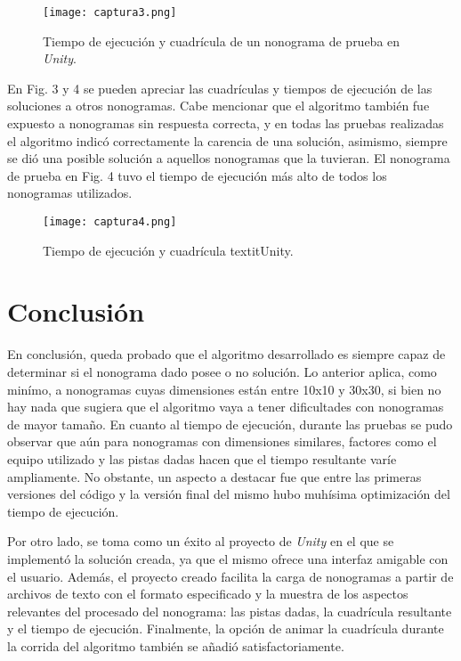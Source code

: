 \documentclass[conference]{IEEEtran}
\begin{document}
\begin{figure}[htbp]
\centerline{\texttt{[image: captura3.png]}}
\caption{Tiempo de ejecución y cuadrícula de un nonograma de prueba en \textit{Unity}.}
\label{Aleatorio20x30}
\end{figure}

En Fig. 3 y 4 se pueden apreciar las cuadrículas y tiempos de ejecución de las soluciones a otros nonogramas. Cabe mencionar que el algoritmo también fue expuesto a nonogramas sin respuesta correcta, y en todas las pruebas realizadas el algoritmo indicó correctamente la carencia de una solución, asimismo, siempre se dió una posible solución a aquellos nonogramas que la tuvieran. El nonograma de prueba en Fig. 4 tuvo el tiempo de ejecución más alto de todos los nonogramas utilizados.

\begin{figure}[htbp]
\centerline{\texttt{[image: captura4.png]}}
\caption{Tiempo de ejecución y cuadrícula textit{Unity}.}
\label{Aleatorio20x20}
\end{figure}

\section{Conclusión}
En conclusión, queda probado que el algoritmo desarrollado es siempre capaz de determinar si el nonograma dado posee o no solución. Lo anterior aplica, como minímo, a nonogramas cuyas dimensiones están entre 10x10 y 30x30, si bien no hay nada que sugiera que el algoritmo vaya a tener dificultades con nonogramas de mayor tamaño. En cuanto al tiempo de ejecución, durante las pruebas se pudo observar que aún para nonogramas con dimensiones similares, factores como el equipo utilizado y las pistas dadas hacen que el tiempo resultante varíe ampliamente. No obstante, un aspecto a destacar fue que entre las primeras versiones del código y la versión final del mismo hubo muhísima optimización del tiempo de ejecución.

Por otro lado, se toma como un éxito al proyecto de \textit{Unity} en el que se implementó la solución creada, ya que el mismo ofrece una interfaz amigable con el usuario. Además, el proyecto creado facilita la carga de nonogramas a partir de archivos de texto con el formato especificado y la muestra de los aspectos relevantes del procesado del nonograma: las pistas dadas, la cuadrícula resultante y el tiempo de ejecución. Finalmente, la opción de animar la cuadrícula durante la corrida del algoritmo también se añadió satisfactoriamente.
\end{document}
